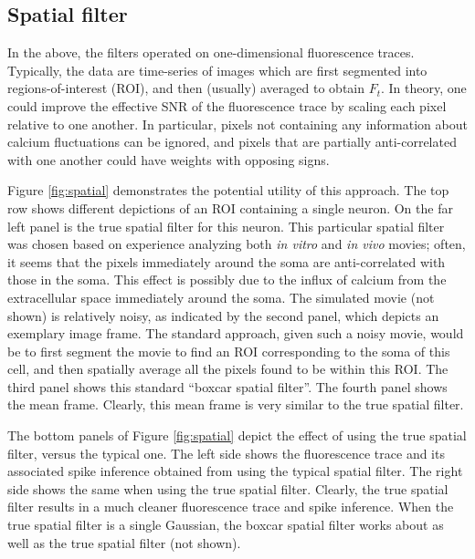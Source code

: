 \subsection{Spatial filter} \label{sec:results:spatial}

In the above, the filters operated on one-dimensional fluorescence traces. Typically, the data are time-series of images which are first segmented into regions-of-interest (ROI), and then (usually) averaged to obtain $F_t$.  In theory, one could improve the effective SNR of the fluorescence trace by scaling each pixel relative to one another.  In particular, pixels not containing any information about calcium fluctuations can be ignored, and pixels that are partially anti-correlated with one another could have weights with opposing signs.  

Figure \ref{fig:spatial} demonstrates the potential utility of this approach.  The top row shows different depictions of an ROI containing a single neuron.  On the far left panel is the true spatial filter for this neuron.  This particular spatial filter was chosen based on experience analyzing both \emph{in vitro} and \emph{in vivo} movies; often, it seems that the pixels immediately around the soma are anti-correlated with those in the soma.  This effect is possibly due to the influx of calcium from the extracellular space immediately around the soma.  The simulated movie (not shown) is relatively noisy, as indicated by the second panel, which depicts an exemplary image frame.  The standard approach, given such a noisy movie, would be to first segment the movie to find an ROI corresponding to the soma of this cell, and then spatially average all the pixels found to be within this ROI.  The third panel shows this standard ``boxcar spatial filter''.  The fourth panel shows the mean frame.  Clearly, this mean frame is very similar to the true spatial filter.  

The bottom panels of Figure \ref{fig:spatial} depict the effect of using the true spatial filter, versus the typical one. The left side shows the fluorescence trace and its associated spike inference obtained from using the typical spatial filter.  The right side shows the same when using the true spatial filter.  Clearly, the true spatial filter results in a much cleaner fluorescence trace and spike inference.  When the true spatial filter is a single Gaussian, the boxcar spatial filter works about as well as the true spatial filter (not shown).


